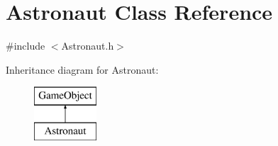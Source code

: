 \hypertarget{class_astronaut}{}\section{Astronaut Class Reference}
\label{class_astronaut}


{\ttfamily \#include $<$Astronaut.\+h$>$}

Inheritance diagram for Astronaut\+:\begin{figure}[H]
\begin{center}
\leavevmode
\includegraphics[height=2.000000cm]{class_astronaut}
\end{center}
\end{figure}
